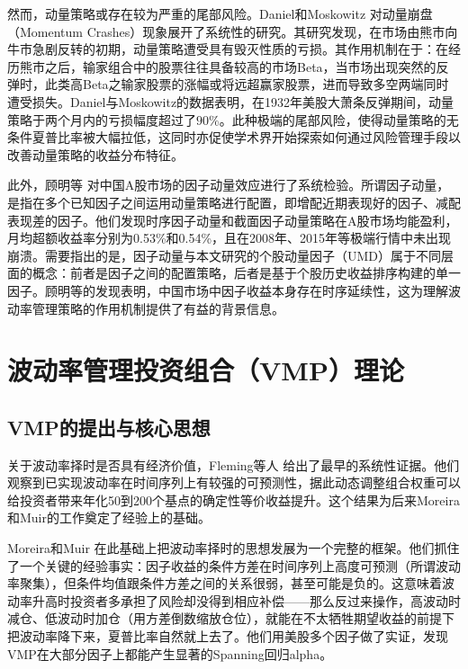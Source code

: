 \documentclass[
    decl-page,
    oneside,
  ]{njuthesis}
\begin{document}
然而，动量策略或存在较为严重的尾部风险。Daniel和Moskowitz \cite{daniel2016momentum} 对动量崩盘（Momentum Crashes）现象展开了系统性的研究。其研究发现，在市场由熊市向牛市急剧反转的初期，动量策略遭受具有毁灭性质的亏损。其作用机制在于：在经历熊市之后，输家组合中的股票往往具备较高的市场Beta，当市场出现突然的反弹时，此类高Beta之输家股票的涨幅或将远超赢家股票，进而导致多空两端同时遭受损失。Daniel与Moskowitz的数据表明，在1932年美股大萧条反弹期间，动量策略于两个月内的亏损幅度超过了$90\%$。此种极端的尾部风险，使得动量策略的无条件夏普比率被大幅拉低，这同时亦促使学术界开始探索如何通过风险管理手段以改善动量策略的收益分布特征。

此外，顾明等 \cite{guming2024factor} 对中国A股市场的因子动量效应进行了系统检验。所谓因子动量，是指在多个已知因子之间运用动量策略进行配置，即增配近期表现好的因子、减配表现差的因子。他们发现时序因子动量和截面因子动量策略在A股市场均能盈利，月均超额收益率分别为0.53\%和0.54\%，且在2008年、2015年等极端行情中未出现崩溃。需要指出的是，因子动量与本文研究的个股动量因子（UMD）属于不同层面的概念：前者是因子之间的配置策略，后者是基于个股历史收益排序构建的单一因子。顾明等的发现表明，中国市场中因子收益本身存在时序延续性，这为理解波动率管理策略的作用机制提供了有益的背景信息。

\section{波动率管理投资组合（VMP）理论}

\subsection{VMP的提出与核心思想}

关于波动率择时是否具有经济价值，Fleming等人 \cite{fleming2001economic} 给出了最早的系统性证据。他们观察到已实现波动率在时间序列上有较强的可预测性，据此动态调整组合权重可以给投资者带来年化50到200个基点的确定性等价收益提升。这个结果为后来Moreira和Muir的工作奠定了经验上的基础。

Moreira和Muir \cite{moreira2017volatility} 在此基础上把波动率择时的思想发展为一个完整的框架。他们抓住了一个关键的经验事实：因子收益的条件方差在时间序列上高度可预测（所谓波动率聚集），但条件均值跟条件方差之间的关系很弱，甚至可能是负的。这意味着波动率升高时投资者多承担了风险却没得到相应补偿——那么反过来操作，高波动时减仓、低波动时加仓（用方差倒数缩放仓位），就能在不太牺牲期望收益的前提下把波动率降下来，夏普比率自然就上去了。他们用美股多个因子做了实证，发现VMP在大部分因子上都能产生显著的Spanning回归alpha。
\end{document}
